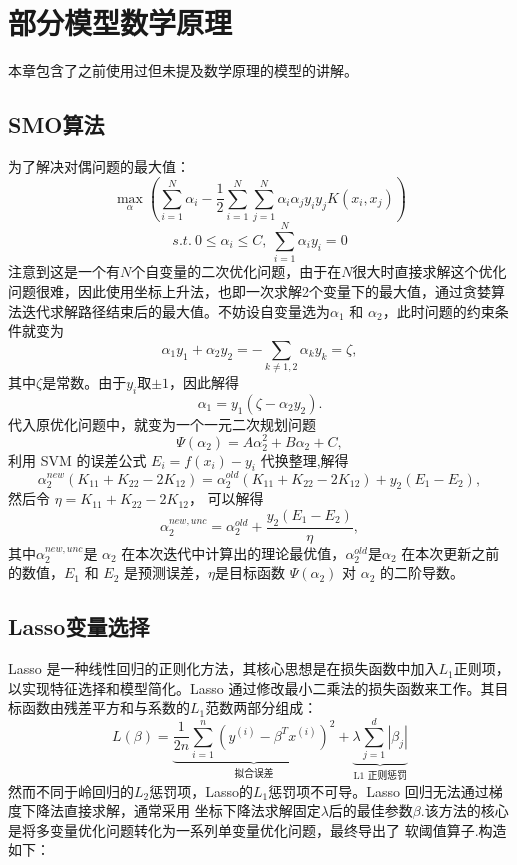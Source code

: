 \documentclass[11pt, a4paper]{article}
\begin{document}
\section{部分模型数学原理}
本章包含了之前使用过但未提及数学原理的模型的讲解。
\subsection{SMO算法}
为了解决对偶问题的最大值：
$$\max_{\alpha} \left( \sum_{i=1}^{N} \alpha_i - \frac{1}{2} \sum_{i=1}^{N} \sum_{j=1}^{N} \alpha_i \alpha_j y_i y_j K(x_i, x_j) \right)$$
$$ s.t.\ 0 \le \alpha_i \le C,\ \sum_{i=1}^{N} \alpha_i y_i = 0$$
注意到这是一个有$N$个自变量的二次优化问题，由于在$N$很大时直接求解这个优化问题很难，因此使用坐标上升法，也即一次求解2个变量下的最大值，通过贪婪算法迭代求解路径结束后的最大值。不妨设自变量选为$\alpha_1$ 和 $\alpha_2$，此时问题的约束条件就变为
$$\alpha_1 y_1 + \alpha_2 y_2 = -\sum_{k \neq 1,2} \alpha_k y_k = \zeta,$$
其中$\zeta$是常数。由于$y_i$取$\pm 1$，因此解得$$\alpha_1 = y_1 (\zeta - \alpha_2 y_2).$$
代入原优化问题中，就变为一个一元二次规划问题$$\Psi(\alpha_2) = A \alpha_2^2 + B \alpha_2 + C,$$利用 SVM 的误差公式 $E_i = f(x_i) - y_i$ 代换整理,解得$$\alpha_2^{new} (K_{11} + K_{22} - 2K_{12}) = \alpha_2^{old} (K_{11} + K_{22} - 2K_{12}) + y_2 (E_1 - E_2),$$然后令 $\eta = K_{11} + K_{22} - 2K_{12}$，
可以解得$$\alpha_2^{new, unc} = \alpha_2^{old} + \frac{y_2 (E_1 - E_2)}{\eta},$$其中$\alpha_2^{new, unc}$是 $\alpha_2$ 在本次迭代中计算出的理论最优值，$\alpha_2^{old}$是$\alpha_2$ 在本次更新之前的数值，$E_1$ 和 $E_2$ 是预测误差，$\eta$是目标函数 $\Psi(\alpha_2)$ 对 $\alpha_2$ 的二阶导数。

\subsection{Lasso变量选择}
Lasso 是一种线性回归的正则化方法，其核心思想是在损失函数中加入$ L_1 $正则项，以实现特征选择和模型简化。Lasso 通过修改最小二乘法的损失函数来工作。其目标函数由残差平方和与系数的$L_1$范数两部分组成：
$$L(\beta) = \underbrace{\frac{1}{2n}\sum_{i=1}^{n}(y^{(i)}-\beta^T x^{(i)})^2}_{\text{拟合误差}} + \underbrace{\lambda\sum_{j=1}^{d}|\beta_j|}_{\text{L1 正则惩罚}}$$
然而不同于岭回归的$L_2$惩罚项，Lasso的$L_1$惩罚项不可导。Lasso 回归无法通过梯度下降法直接求解，通常采用 坐标下降法求解固定$\lambda$后的最佳参数$\beta$.该方法的核心是将多变量优化问题转化为一系列单变量优化问题，最终导出了 软阈值算子.构造如下：
\end{document}
